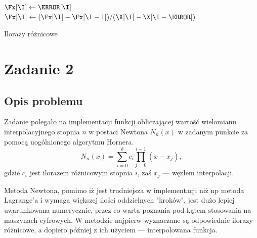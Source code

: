 \documentclass{classrep}
\begin{document}
		\begin{algorithm}[!h]
			
		    	
    			\Fun{\iloraz{\X, \F}} {
    				 {
		    			$\Fx[\I]\gets\F[\I]$\;
		    		}
		    		 {
			    		\For{\I $\gets$\N \KwDownTo \I} {
			    			$\Fx[\I] \gets (\Fx[\I] - \Fx[\I - 1]) / (\X[\I] - \X[\I - \J])$\;
		    			}
		    		}
				\KwRet \Fx\;
		    }
    			\caption{Ilorazy różnicowe}
    			\label{algo:1}
		\end{algorithm}		
	
\section{Zadanie 2}
	\subsection{Opis problemu}
		Zadanie polegało na implementacji funkcji obliczającej wartość wielomianu interpolacyjnego stopnia $n$ w postaci Newtona $N_n(x)$ w zadanym punkcie za pomocą uogólnionego algorytmu Hornera.
		$$N_n(x) = \sum_{i=0}^k c_i \prod_{j=0}^{i-1}(x-x_j),$$
		gdzie $c_i$ jest ilorazem różnicowym stopnia $i$, zaś $x_j$ --- węzłem interpolacji.
		
		Metoda Newtona, pomimo iż jest trudniejsza w implementacji niż np metoda Lagrange'a i wymaga większej ilości oddzielnych "kroków", jest dużo lepiej uwarunkowana numerycznie, przez co warta poznania pod kątem stosowania na maszynach cyfrowych. W metodzie najpierw wyznaczane są odpowiednie ilorazy różnicowe, a dopiero później z ich użyciem --- interpolowana funkcja.
				
\end{document}
